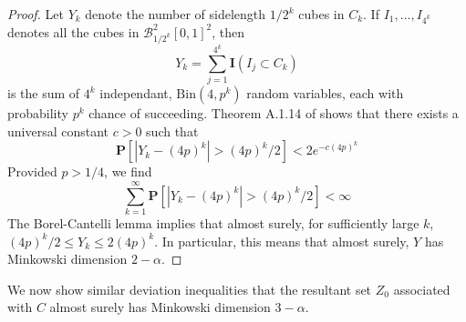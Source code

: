 \documentclass[dvipsnames]{article}
\theoremstyle{plain}
\theoremstyle{plain}
\begin{document}
\begin{proof}
	Let $Y_k$ denote the number of sidelength $1/2^k$ cubes in $C_k$. If $I_1, \dots, I_{4^k}$ denotes all the cubes in $\mathcal{B}^2_{1/2^k}[0,1]^2$, then
	\[ Y_k = \sum_{j = 1}^{4^k} \mathbf{I}(I_j \subset C_k) \]
	is the sum of $4^k$ independant, $\text{Bin}(4,p^k)$ random variables, each with probability $p^k$ chance of succeeding. Theorem A.1.14 of %
	shows that there exists a universal constant $c > 0$ such that
	\[ \mathbf{P} \left[ |Y_k - (4p)^k| > (4p)^k/2 \right] < 2e^{-c (4p)^k} \]
	Provided $p > 1/4$, we find
	\[ \sum_{k = 1}^\infty \mathbf{P} \left[ |Y_k - (4p)^k| > (4p)^k/2 \right] < \infty \]
	The Borel-Cantelli lemma implies that almost surely, for sufficiently large $k$, $(4p)^k/2 \leq Y_k \leq 2(4p)^k$. In particular, this means that almost surely, $Y$ has Minkowski dimension $2 - \alpha$.
\end{proof}

We now show similar deviation inequalities that the resultant set $Z_0$ associated with $C$ almost surely has Minkowski dimension $3 - \alpha$.
\end{document}
